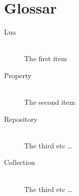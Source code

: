 
\section{Glossar}


\begin{description}
  \item[Lua] \hfill \\
  The first item
  \item[Property] \hfill \\
  The second item
  \item[Repository] \hfill \\
  The third etc \ldots
  \item[Collection] \hfill \\
  The third etc \ldots
\end{description}



